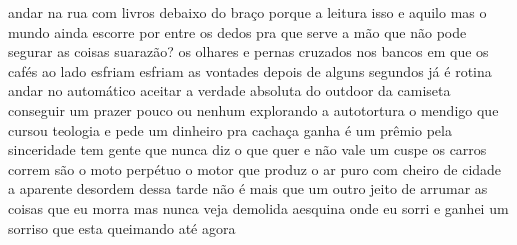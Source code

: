 \begin{poem}
\begin{stanza}
andar na rua com livros\verseline
debaixo do braço\verseline
porque a leitura isso e aquilo\verseline
\qquad mas o mundo ainda escorre\verseline
\qquad por entre os dedos\verseline
\qquad \qquad pra que serve a mão\verseline
\qquad \qquad que não pode segurar\verseline
\qquad \qquad as coisas \quad suarazão?\verseline
os olhares e pernas cruzados\verseline
nos bancos em que\verseline
os cafés ao lado esfriam\verseline
\qquad esfriam as vontades\verseline
\qquad depois de alguns segundos\verseline
já é rotina andar no automático\verseline
aceitar a verdade absoluta\verseline
do outdoor da camiseta\verseline
\qquad conseguir um prazer\verseline
\qquad pouco ou nenhum\verseline
\qquad explorando a autotortura\verseline
o mendigo que cursou teologia\verseline
e pede um dinheiro pra cachaça\verseline
\qquad \qquad \qquad ganha\verseline
\qquad é um prêmio pela sinceridade\verseline
\qquad \qquad tem gente\verseline
\qquad \qquad que nunca diz o que quer\verseline
\qquad \qquad e não vale um cuspe\verseline
os carros correm\verseline
são o moto perpétuo\verseline
o motor que produz\verseline
o ar puro\verseline
com cheiro de cidade\verseline
\qquad a aparente desordem\verseline
\qquad dessa tarde\verseline
\qquad não é mais que um outro jeito\verseline
\qquad de arrumar as coisas\verseline
que eu morra\verseline
mas nunca veja demolida\verseline
aesquina onde eu sorri\verseline
e ganhei um sorriso\verseline
que esta queimando até agora
\end{stanza}
\end{poem}